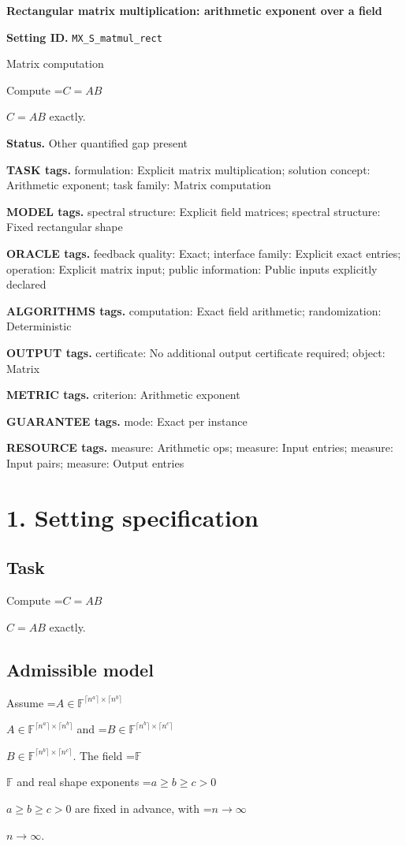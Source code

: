 \documentclass[10pt,a4paper]{article}
\newcommand{\AtlasMath}[1]{\par\begingroup\centering\setbox0=\hbox{$\displaystyle #1$}\ifdim\wd0>1.4\linewidth\typeout{ATLAS WIDE FORMULA: \the\wd0}\fi\ifdim\wd0>\linewidth\resizebox{\linewidth}{!}{\box0}\else\box0\fi\par\endgroup}
\newcommand{\AtlasInlineMath}[1]{\begingroup\setbox0=\hbox{$#1$}\ifdim\wd0>.4\linewidth\endgroup\AtlasMath{#1}\else\endgroup$#1$\fi}
\begin{document}
\raggedright

{\LARGE\bfseries\sffamily\color{AtlasNavy} Rectangular matrix multiplication: arithmetic exponent over a field\par}\vspace{5pt}
\textbf{Setting ID.} \texttt{MX\_\allowbreak{}S\_\allowbreak{}matmul\_\allowbreak{}rect}

Matrix computation

Compute \AtlasInlineMath{C=AB} exactly.

\textbf{Status.} Other quantified gap present

\textbf{TASK tags.} formulation: Explicit matrix multiplication; solution concept: Arithmetic exponent; task family: Matrix computation

\textbf{MODEL tags.} spectral structure: Explicit field matrices; spectral structure: Fixed rectangular shape

\textbf{ORACLE tags.} feedback quality: Exact; interface family: Explicit exact entries; operation: Explicit matrix input; public information: Public inputs explicitly declared

\textbf{ALGORITHMS tags.} computation: Exact field arithmetic; randomization: Deterministic

\textbf{OUTPUT tags.} certificate: No additional output certificate required; object: Matrix

\textbf{METRIC tags.} criterion: Arithmetic exponent

\textbf{GUARANTEE tags.} mode: Exact per instance

\textbf{RESOURCE tags.} measure: Arithmetic ops; measure: Input entries; measure: Input pairs; measure: Output entries

\section{1. Setting specification}
\subsection{Task}
Compute \AtlasInlineMath{C=AB} exactly.

\subsection{Admissible model}
Assume \AtlasInlineMath{A\in\mathbb{F}^{\lceil n^a\rceil\times\lceil n^b\rceil}} and \AtlasInlineMath{B\in\mathbb{F}^{\lceil n^b\rceil\times\lceil n^c\rceil}}. The field \AtlasInlineMath{\mathbb{F}} and real shape exponents \AtlasInlineMath{a\ge b\ge c>0} are fixed in advance, with \AtlasInlineMath{n\to\infty}.
\end{document}

